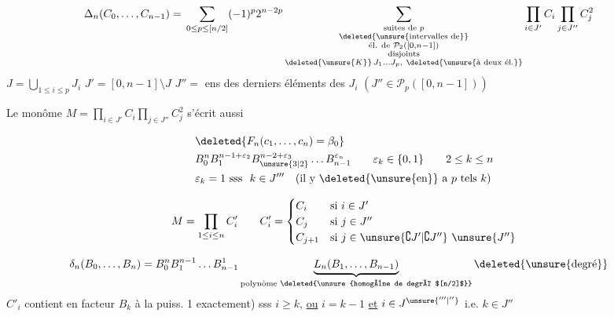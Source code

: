 \[
\begin{aligned}
\Delta_n(C_0,\ldots,C_{n-1})={}&\sum_{0\le p\le[n/2]}(-1)^p2^{n-2p}\sum_{\substack{\text{suites de }p\\\deleted{\unsure{\text{intervalles de}}}\\\text{él. de }\mathcal P_2([0,n-1])\\\text{disjoints}\\
\deleted{\unsure{K}}\,J_1\ldots J_p,\ \deleted{\unsure{\text{à deux él.}}}}}
\prod_{i\in J'}C_i\prod_{j\in J''}C_j^2
\end{aligned}
\]
$J=\bigcup_{1\le i\le p}J_i$ \quad $J'=[0,n-1]\setminus J$ \quad $J''=$ ens des derniers éléments des $J_i$ $(J''\in\mathcal P_p([0,n-1]))$


 Le monôme $M=\prod_{i\in J'}C_i\prod_{j\in J''}C_j^2$ s'écrit aussi

\[
\begin{aligned}
&\deleted{F_n(c_1,\ldots,c_n)=\beta_0}\\
&B_0^n B_1^{n-1+\varepsilon_2}B_{\unsure{3|2}}^{n-2+\varepsilon_3}\ldots B_{n-1}^{\varepsilon_n}
\qquad\varepsilon_k\in\{0,1\}\qquad2\le k\le n\\
&\varepsilon_k=1\ \text{sss }\ k\in J'''\quad\text{(il y \deleted{\unsure{en}} a $p$ tels $k$)}
\end{aligned}
\]


\[
M=\prod_{1\le i\le n}C'_i\qquad
C'_i=\begin{cases}
C_i&\text{si }i\in J'\\
C_j&\text{si }j\in J''\\
C_{j+1}&\text{si }j\in\unsure{\complement J'|\complement J''}\ \unsure{J''}
\end{cases}
\]

\[
\begin{aligned}
\delta_n(B_0,\ldots,B_{n})&=
 B_0^n B_1^{n-1}\ldots B_{n-1}^{1}\underbrace{L_n(B_1,\ldots,B_{n-1})}_{\text{polynôme \deleted{\unsure{homogène de degré $[n/2]$}}}}
 \deleted{\unsure{\text{degré}}}
\end{aligned}
\]
 $C'_i$ contient en facteur $B_k$  à la puiss. 1 exactement) sss  $i\ge k$, \uline{ou} $i=k-1$ \uline{et} $i\in J^{\unsure{'''|''}}$ i.e. $k\in J''$

